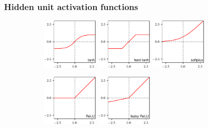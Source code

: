 \documentclass{beamer}
\begin{document}
\begin{frame}
    \frametitle{Hidden unit activation functions}
    \begin{figure}
        \caption{A variety of nonlinear activation functions}
        \begin{subfigure}{0.8\textwidth}
            \includegraphics[width=0.3\textwidth]{Figure_12_a.pdf}
            \includegraphics[width=0.3\textwidth]{Figure_12_b.pdf}
            \includegraphics[width=0.3\textwidth]{Figure_12_c.pdf}
        \end{subfigure}
        \begin{subfigure}{0.8\textwidth}
            \includegraphics[width=0.3\textwidth]{Figure_12_d.pdf}
            \includegraphics[width=0.3\textwidth]{Figure_12_e.pdf}

\end{subfigure}
\end{figure}
\end{frame}
\end{document}
